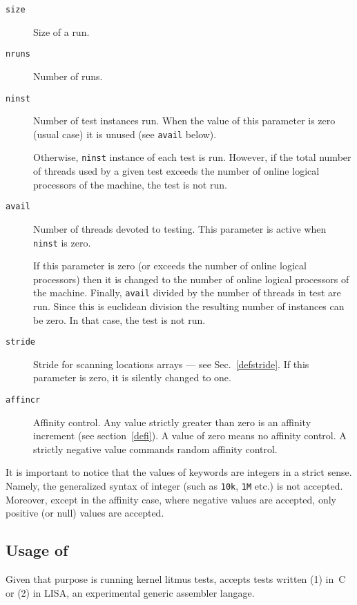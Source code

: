 \begin{description}
\item[{\tt size}] Size of a run.

\item[{\tt nruns}] Number of runs.

\item[{\tt ninst}] Number of test instances run.
When the value of this parameter is zero (usual case)
it is unused (see \texttt{avail} below).

Otherwise, \texttt{ninst} instance of each test is run.
However, if the total number of threads used by a given test exceeds
the number of online logical processors of the machine, the test is not run.

\item[{\tt avail}] Number of threads devoted to testing.
This parameter is active when \texttt{ninst} is zero.

If this parameter is zero (or exceeds the number of online logical processors)
then it is changed to the number of online logical processors of the machine.
Finally, \texttt{avail} divided by the number of threads in test are run.
Since this is euclidean division the resulting number of instances can be zero.
In that case, the test is not run.


\item[{\tt stride}] Stride for scanning locations arrays ---
see Sec.~\ref{defstride}. If this parameter is zero, it is silently
changed to one.

\item[{\tt affincr}] Affinity control. Any value strictly greater
than zero is an affinity increment (see section~\ref{defi}).
A value of zero means no affinity control. A strictly negative value commands
random affinity control.
\end{description}

It is important to notice that the values of keywords are integers in a
strict sense.
Namely, the generalized syntax of integer (such as \texttt{10k}, \texttt{1M}
etc.) is not accepted.
Moreover, except in the affinity case, where negative values are accepted,
only positive (or null) values are accepted.

\subsection{Usage of \klitmus}

Given that \klitmus{} purpose is running kernel litmus tests, \klitmus{}
accepts tests written (1) in~C or (2) in LISA, an experimental
generic assembler langage.

